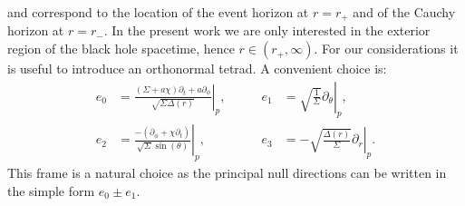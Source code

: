 \documentclass[reqno]{amsart}
\numberwithin{equation}{section}
\theoremstyle{plain}
\theoremstyle{definition}
\begin{document}
and correspond to the location of the event horizon at $r=r_+$ and of the Cauchy horizon at $r=r_-$. In the present work we are only interested in the exterior region of the black hole spacetime, hence $r\in(r_+,\infty)$.
 For our considerations it is useful to introduce an orthonormal tetrad. A convenient choice is:
\begin{subequations}\label{eq:tetrad}
\begin{align}
e_0 &= \left.\frac{(\Sigma + a \chi)\partial_t+ a\partial_\phi}{\sqrt {\Sigma\Delta(r)}}\right|_p ,&\qquad e_1&=\left.\sqrt{\frac{1}{\Sigma}}\partial_\theta\right|_p, \\ \nonumber
e_2&=\left.\frac{-(\partial_\phi+\chi \partial_t)}{\sqrt{\Sigma}\sin(\theta)}\right|_p,&\qquad e_3&=\left.-\sqrt{\frac{\Delta(r)}{\Sigma}} \partial_r\right|_p.
\end{align}
\end{subequations}
This frame is a natural choice as the principal null directions can be written in the simple form $e_0 \pm e_1$. 
\end{document}
